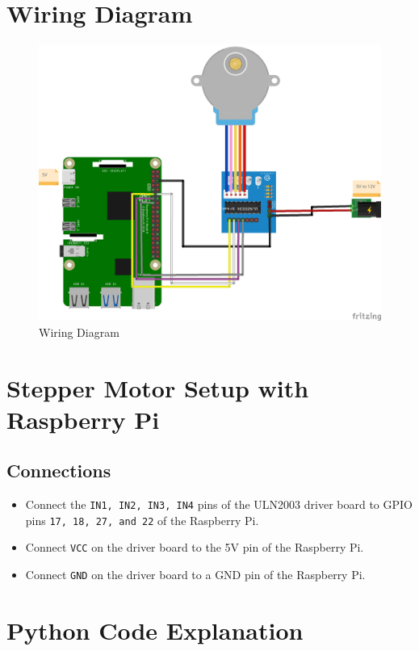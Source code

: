 \documentclass{article}
\begin{document}
	\section*{Wiring Diagram}
	\begin{figure}[H]
		\centering
		\includegraphics[width=1.2\textwidth]{08b-stepper-motor-diagram.png} %
		\caption{Wiring Diagram}
	\end{figure}
	
	\section*{Stepper Motor Setup with Raspberry Pi}
	\subsection*{Connections}
	\begin{itemize}
		\item Connect the \texttt{IN1, IN2, IN3, IN4} pins of the ULN2003 driver board to GPIO pins \texttt{17, 18, 27, and 22} of the Raspberry Pi.
		\item Connect \texttt{VCC} on the driver board to the 5V pin of the Raspberry Pi.
		\item Connect \texttt{GND} on the driver board to a GND pin of the Raspberry Pi.
	\end{itemize}
	
	\section*{Python Code Explanation}
	
\end{document}
